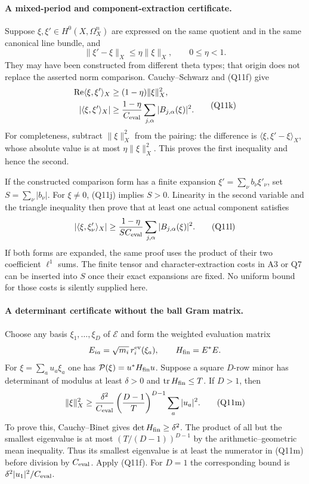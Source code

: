 \documentclass[11pt]{article}
\theoremstyle{definition}\newtheorem{definition}[theorem]{Definition}\newtheorem{remark}[theorem]{Remark}
\begin{document}
\paragraph{A mixed-period and component-extraction certificate.}
Suppose $\xi,\xi'\in H^0(X,\Omega_X^n)$ are expressed on the
same quotient and in the same canonical line bundle, and
\[
       \|\xi'-\xi\|_X\leq\eta\|\xi\|_X,
       \qquad 0\leq\eta<1.
 \tag{Q11j}
\]
They may have been constructed from different theta types;
that origin does not replace the asserted norm comparison.
Cauchy--Schwarz and (Q11f) give
\[
 \begin{split}
 \operatorname{Re}\langle\xi,\xi'\rangle_X
      &\geq(1-\eta)\|\xi\|_X^2,\\
 |\langle\xi,\xi'\rangle_X|
      &\geq\frac{1-\eta}{C_{\rm eval}}
                    \sum_{j,\alpha}|B_{j,\alpha}(\xi)|^2.
 \end{split}
 \tag{Q11k}
\]
For completeness, subtract $\|\xi\|_X^2$ from the pairing:
the difference is $\langle\xi,\xi'-\xi\rangle_X$, whose
absolute value is at most $\eta\|\xi\|_X^2$.  This proves
the first inequality and hence the second.

If the constructed comparison form has a finite expansion
$\xi'=\sum_\nu b_\nu\xi'_\nu$, set
$S=\sum_\nu|b_\nu|$.  For $\xi\ne0$, (Q11j) implies $S>0$.
Linearity in the second variable and the triangle inequality
then prove that at least one actual component satisfies
\[
 |\langle\xi,\xi'_\nu\rangle_X|
       \geq\frac{1-\eta}{S C_{\rm eval}}
                    \sum_{j,\alpha}|B_{j,\alpha}(\xi)|^2.
 \tag{Q11l}
\]
If both forms are expanded, the same proof uses the product
of their two coefficient $\ell^1$ sums.  The finite tensor and
character-extraction costs in A3 or Q7 can be inserted into
$S$ once their exact expansions are fixed.  No uniform bound
for those costs is silently supplied here.

\paragraph{A determinant certificate without the ball Gram matrix.}
Choose any basis $\xi_1,\ldots,\xi_D$ of $\mathcal E$ and form
the weighted evaluation matrix
\[
 E_{ia}=\sqrt{m_i}\,r_i^{\rm ev}(\xi_a),\qquad
 H_{\rm fin}=E^*E.
\]
For $\xi=\sum_a u_a\xi_a$ one has
$\mathcal P(\xi)=u^*H_{\rm fin}u$.  Suppose a square
$D$-row minor has determinant of modulus at least $\delta>0$
and $\operatorname{tr}H_{\rm fin}\leq T$.  If $D>1$, then
\[
 \|\xi\|_X^2
    \geq\frac{\delta^2}{C_{\rm eval}}
               \left(\frac{D-1}{T}\right)^{D-1}
                         \sum_a|u_a|^2 .
 \tag{Q11m}
\]
To prove this, Cauchy--Binet gives
$\det H_{\rm fin}\geq\delta^2$.  The product of all but
the smallest eigenvalue is at most
$(T/(D-1))^{D-1}$ by the arithmetic--geometric mean inequality.
Thus its smallest eigenvalue is at least the numerator in
(Q11m) before division by $C_{\rm eval}$.  Apply (Q11f).
For $D=1$ the corresponding bound is
$\delta^2|u_1|^2/C_{\rm eval}$.
\end{document}
